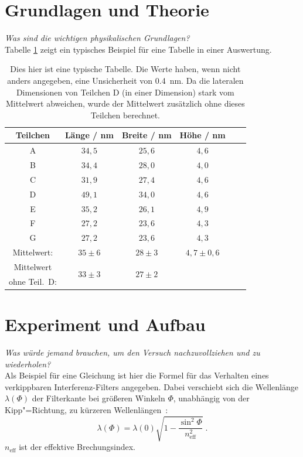 \documentclass[11pt,a4paper]{scrartcl}
\begin{document}
\section{Grundlagen und Theorie}
\label{sec:Grundlagen}
%
\textit{Was sind die wichtigen physikalischen Grundlagen?}\\
Tabelle \ref{tab:exapltab} zeigt ein typisches Beispiel für eine Tabelle in einer Auswertung.
\begin{table}[htbp]
\centering
\caption{\label{tab:exapltab}Dies hier ist eine typische Tabelle. Die Werte haben, wenn nicht anders angegeben, eine Unsicherheit von \SI{0,4}{\nano\meter}. Da die lateralen Dimensionen von Teilchen D (in einer Dimension) stark vom Mittelwert abweichen, wurde der Mittelwert zusätzlich ohne dieses Teilchen berechnet.}
\begin{tabular}{cccccc}
\toprule
\multicolumn{1}{c}{Teilchen}	& \multicolumn{1}{c}{Länge / \si{\nano\meter}}		& \multicolumn{1}{c}{Breite / \si{\nano\meter}}	& \multicolumn{1}{c}{Höhe / \si{\nano\meter}} \\
\midrule
\multirow{1}{*}{A} & $34,5$	& $25,6$		& $4,6$		  \\
\multirow{1}{*}{B} & $34,4$	& $28,0$		& $4,0$		  \\
\multirow{1}{*}{C} & $31,9$	& $27,4$		& $4,6$		  \\
\multirow{1}{*}{D} & $49,1$	& $34,0$		& $4,6$		 \\
\multirow{1}{*}{E} & $35,2$	& $26,1$		& $4,9$		 \\
\multirow{1}{*}{F} & $27,2$	& $23,6$		& $4,3$		\\  
\multirow{1}{*}{G} & $27,2$	& $23,6$		& $4,3$		  \\
\midrule
\multirow{1}{*}{Mittelwert:} & $35\pm6$	& $28\pm3$		& $4,7\pm0,6$	\\	  
\multirow{1}{*}{Mittelwert} & \multirow{2}{*}{$33\pm3$}	& \multirow{2}{*}{$27\pm2$}		& \multirow{2}{*}{}	\\	  
\multirow{1}{*}{ohne Teil.\ D:} & 	& & \\	  
\bottomrule
\end{tabular}
\end{table}
%
\section{Experiment und Aufbau}
\label{sec:ExpAufb}
%
\textit{Was würde jemand brauchen, um den Versuch nachzuvollziehen und zu wiederholen?}\\
Als Beispiel für eine Gleichung ist hier die Formel für das Verhalten eines verkippbaren Interferenz-Filters angegeben. Dabei verschiebt sich die Wellenlänge $\lambda\left(\Phi\right)$ der Filterkante bei größeren Winkeln $\Phi$, unabhängig von der Kipp"=Richtung, zu kürzeren Wellenlängen~\cite{TiltFilter}:
\begin{equation}
\lambda\left(\Phi\right)=\lambda\left(0\right)\sqrt{1-\frac{\sin^2\Phi}{n_\text{eff}^2}}\;.
\label{eq:TiltWel}
\end{equation}
$n_\text{eff}$ ist der effektive Brechungsindex.
%
\end{document}
